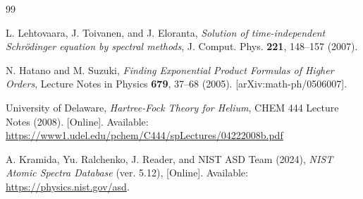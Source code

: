 \documentclass[aps,twocolumn,preprintnumbers]{revtex4}
\begin{document}
  \begin{thebibliography}{99}

L. Lehtovaara, J. Toivanen, and J. Eloranta, 
\textit{Solution of time-independent Schrödinger equation by spectral methods}, 
J. Comput. Phys. \textbf{221}, 148--157 (2007). 

N. Hatano and M. Suzuki,
\textit{Finding Exponential Product Formulas of Higher Orders},
Lecture Notes in Physics \textbf{679}, 37--68 (2005).
[arXiv:math-ph/0506007].

University of Delaware, 
\textit{Hartree-Fock Theory for Helium}, 
CHEM 444 Lecture Notes (2008). 
[Online]. Available: \url{https://www1.udel.edu/pchem/C444/spLectures/04222008b.pdf}

A. Kramida, Yu. Ralchenko, J. Reader, and NIST ASD Team (2024), 
\textit{NIST Atomic Spectra Database} (ver. 5.12), 
[Online]. Available: \url{https://physics.nist.gov/asd}.

\end{thebibliography}
  
\end{document}
